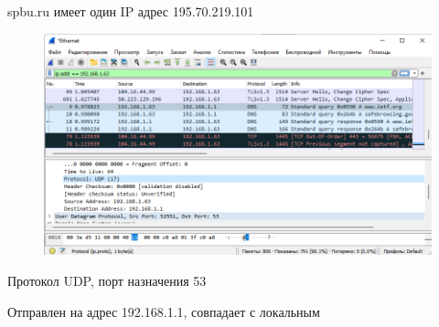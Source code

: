 \documentclass[a4paper,11pt]{article}
\begin{document}
spbu.ru имеет один IP адрес 195.70.219.101
\begin{figure}[h]
\includegraphics[width =\textwidth]{screenshots/4.png}
\label{fig:image}
\end{figure}

Протокол UDP, порт назначения 53

\begin{center}
\label{fig:image}
\end{center}

Отправлен на адрес 192.168.1.1, совпадает с локальным

\begin{center}
\label{fig:image}
\end{center}
\end{document}
